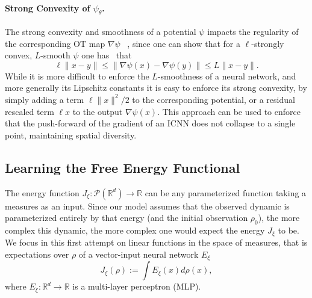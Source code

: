 \vspace{-20pt} \paragraph{Strong Convexity of $\psi_\theta$.} The strong convexity and smoothness of a potential $\psi$ impacts the regularity of the corresponding OT map $\nabla\psi$ ~\citep{caffarelli2000monotonicity,figalli2010optimal}, since one can show that for a $\ell$-strongly convex, $L$-smooth $\psi$ one has~\citep{paty2020regularity} that
$$
\ell \|x - y\| \leq \|\nabla\psi(x) -\nabla\psi(y)\|  \leq L\|x - y\|.
$$
While it is more difficult to enforce the $L$-smoothness of a neural network, and more generally its Lipschitz constants \citep{scaman2018lipschitz} it is easy to enforce its strong convexity, by simply adding a term $\ell \|x\|^2/2$ to the corresponding potential, or a residual rescaled term $\ell x$ to the output $\nabla\psi(x)$. This approach can be used to enforce that the push-forward of the gradient of an ICNN does not collapse to a single point, maintaining spatial diversity.

\subsection{Learning the Free Energy Functional}  \label{sec:learn_energy}
The energy function $J_\xi : \mathcal{P}(\mathbb{R}^d) \rightarrow \mathbb{R}$ can be any parameterized function taking a measures as an input. 
Since our model assumes that the observed dynamic is parameterized entirely by that energy (and the initial observation $\rho_0$), the more complex this dynamic, the more complex one would expect the energy $J_\xi$ to be. We focus in this first attempt on linear functions in the space of measures, that is expectations over $\rho$ of a vector-input neural network $E_\xi$
\begin{equation} \label{eq:energy}
    J_\xi(\rho) := \int E_\xi(x) d\rho(x),
\end{equation}
where $E_\xi:\mathbb{R}^d \rightarrow \mathbb{R}$ is a multi-layer perceptron (MLP).


